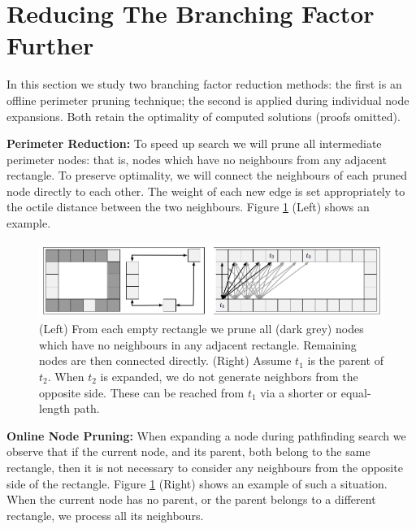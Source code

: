 \section{Reducing The Branching Factor Further}
In this section we study two branching factor reduction methods: the first
is an offline perimeter pruning technique; the second is 
applied during individual node expansions.
Both retain the optimality of computed solutions (proofs omitted).

\noindent
\textbf{Perimeter Reduction:}
To speed up search we will prune all intermediate perimeter nodes: that is, nodes
which have no neighbours from any adjacent rectangle.
To preserve optimality, we will
connect the neighbours of each pruned node directly to each other.  The weight
of each new edge is set appropriately to the octile distance between the two
neighbours.  Figure \ref{fig-branching} (Left) shows an example.  

\begin{figure}[t]
	\begin{center}
	\includegraphics[width=0.97\columnwidth, trim = 10mm 10mm 10mm 0mm]
	{diagrams/branching_wide.png}
	\end{center}
	\vspace{-3pt}
	\caption{(Left) From each empty rectangle we prune all (dark grey) nodes which
	have no neighbours in any adjacent rectangle.
	Remaining nodes are then connected directly.
	(Right) Assume $t_{1}$ is the parent of $t_2$. When $t_2$
	is expanded, we do not generate neighbors from the opposite side.
	These can be reached from $t_1$ via a shorter or equal-length path.
}
\label{fig-branching}
\end{figure}

\noindent
\textbf{Online Node Pruning:}
When expanding a node during pathfinding search we observe that if the current
node, and its parent, both belong to the same rectangle, then it is not
necessary to consider any neighbours from the opposite side of the rectangle.
Figure \ref{fig-branching} (Right) shows an example of such a situation. 
When the current node has no parent, or the parent belongs to a different rectangle, 
we process all its neighbours.
